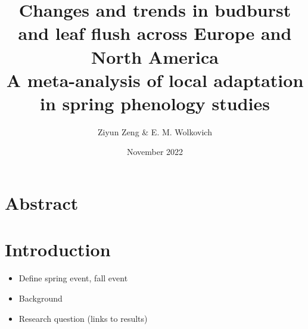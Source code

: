 \documentclass{article}
\begin{document}
\title{{\huge Changes and trends in budburst and leaf flush across Europe and North America} \\A meta-analysis of local adaptation in spring phenology studies}
\author{Ziyun Zeng \& E. M. Wolkovich}
\date{November 2022}
\maketitle 


\newpage

\section*{Abstract}
\section{Introduction}

\begin{itemize}
\item Define spring event, fall event
\item Background
\item Research question (links to results)
\end{itemize}
\end{document}
